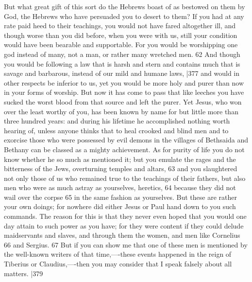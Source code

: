 But what great gift of this sort do the Hebrews boast of as bestowed on them by God, the Hebrews who have persuaded you to desert to them? If you had at any rate paid heed to their teachings, you would not have fared altogether ill, and though worse than you did before, when you were with us, still your condition would have been bearable and supportable. For you would be worshipping one god instead of many, not a man, or rather many wretched men. 62 And though you would be following a law that is harsh and stern and contains much that is savage and barbarous, instead of our mild and humane laws,
|377 and would in other respects be inferior to us, yet you would be more holy and purer than now in your forms of worship. But now it has come to pass that like leeches you have sucked the worst blood from that source and left the purer. Yet Jesus, who won over the least worthy of you, has been known by name for but little more than three hundred years: and during his lifetime he accomplished nothing worth hearing of, unless anyone thinks that to heal crooked and blind men and to exorcise those who were possessed by evil demons in the villages of Bethsaida and Bethany can be classed as a mighty achievement. As for purity of life you do not know whether he so much as mentioned it; but you emulate the rages and the bitterness of the Jews, overturning temples and altars, 63 and you slaughtered not only those of us who remained true to the teachings of their fathers, but also men who were as much astray as yourselves, heretics, 64 because they did not wail over the corpse
65 in the same fashion as yourselves. But these are rather your own doings; for nowhere did either Jesus or Paul hand down to you such commands. The reason for this is that they never even hoped that you would one day attain to such power as you have; for they were content if they could delude maidservants and slaves, and through them the women, and men like Cornelius
66 and Sergius. 67 But if you can show me that one of these men is mentioned by the well-known writers of that time,----these events happened in the reign of Tiberius or Claudius,----then you may consider that I speak falsely about all matters.
|379


